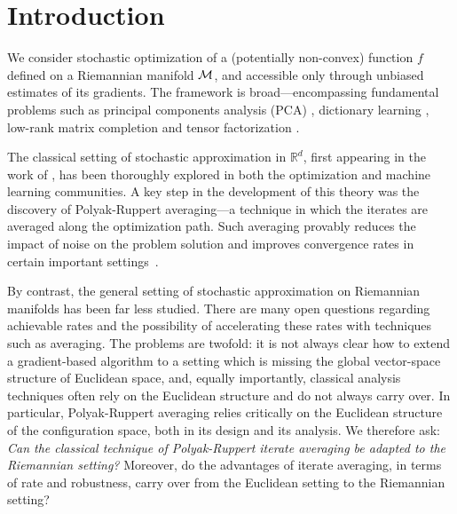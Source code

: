 \vspace{-0.21pt}
\section{Introduction}
\vspace{-0.22pt}
We consider stochastic optimization of a (potentially non-convex) function $f$  defined on a Riemannian manifold $\mathcal{M}$, and accessible only through unbiased estimates of its gradients.
The framework is broad---encompassing fundamental problems such as principal components analysis (PCA) \citep{edelman1998geometry}, dictionary learning \citep{SunQinWri17}, low-rank matrix completion \citep{BouAbs11} and tensor factorization \citep{IshAbsVanDeL11}.

The classical setting of stochastic approximation in $\mathbb{R}^d$, first appearing in the work of
\citet{robbins1951stochastic}, has been thoroughly explored in both the optimization and machine learning communities. A key step in the development of this theory was the discovery of Polyak-Ruppert averaging---a technique in which the iterates are averaged along the optimization path. Such averaging provably reduces the impact of noise on the problem solution and improves convergence rates in certain important settings~\citep{Pol90, ruppert1988efficient}.

By contrast, the general setting of stochastic approximation  on Riemannian manifolds has been far less studied. There are many open questions regarding achievable rates and the possibility of accelerating these rates with techniques such as averaging.  The problems are twofold: it is not always clear how to extend a gradient-based algorithm to a setting which is missing the global vector-space structure of Euclidean space, and, equally importantly, classical analysis techniques often rely on the Euclidean structure and do not always carry over. In particular, Polyak-Ruppert averaging  relies critically on the Euclidean structure of the configuration space, both in its design and its analysis.  We therefore ask: \emph{Can the classical technique of Polyak-Ruppert iterate averaging be adapted to the Riemannian setting?}  Moreover, do the advantages of iterate averaging, in terms of rate and robustness, carry over from the Euclidean setting to the Riemannian setting?

